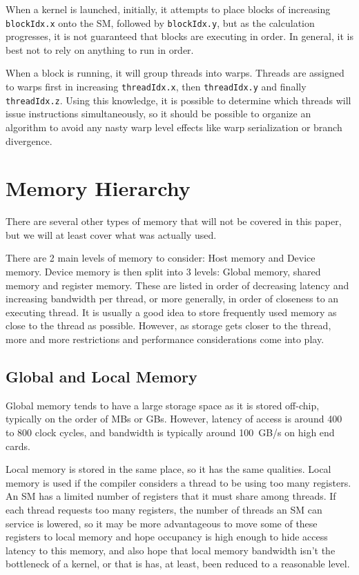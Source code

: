 \documentclass[a4paper,12pt]{report}
\begin{document}
When a kernel is launched, initially, it attempts to place blocks of increasing \verb!blockIdx.x! onto the SM, followed by \verb!blockIdx.y!, but as the calculation progresses, it is not guaranteed that blocks are executing in order.
In general, it is best not to rely on anything to run in order.

When a block is running, it will group threads into warps.
Threads are assigned to warps first in increasing \verb!threadIdx.x!, then \verb!threadIdx.y! and finally \verb!threadIdx.z!.
Using this knowledge, it is possible to determine which threads will issue instructions simultaneously, so it should be possible to organize an algorithm to avoid any nasty warp level effects like warp serialization or branch divergence.


\section{Memory Hierarchy}
There are several other types of memory that will not be covered in this paper, but we will at least cover what was actually used.

There are 2 main levels of memory to consider: Host memory and Device memory\cite[p~10]{ CUDA_C_Programming_Guide}.
Device memory is then split into 3 levels: Global memory, shared memory and register memory.
These are listed in order of decreasing latency and increasing bandwidth per thread, or more generally, in order of closeness to an executing thread\cite[p~84]{ CUDA_C_Programming_Guide}.
It is usually a good idea to store frequently used memory as close to the thread as possible.
However, as storage gets closer to the thread, more and more restrictions and performance considerations come into play.

\subsection{Global and Local Memory}

Global memory tends to have a large storage space as it is stored off-chip, typically on the order of MBs or GBs.
However, latency of access is around 400 to 800 clock cycles\cite[p~85]{ CUDA_C_Programming_Guide}, and bandwidth is typically around 100~GB/s\cite[p~78]{ KirkAndHwu} on high end cards.

Local memory is stored in the same place, so it has the same qualities\cite[p~89]{ CUDA_C_Programming_Guide}.
Local memory is used if the compiler considers a thread to be using too many registers.
An SM has a limited number of registers that it must share among threads\cite[p~80]{ CUDA_C_Programming_Guide}.
If each thread requests too many registers, the number of threads an SM can service is lowered, so it may be more advantageous to move some of these registers to local memory and hope occupancy is high enough to hide access latency to this memory, and also hope that local memory bandwidth isn't the bottleneck of a kernel, or that is has, at least, been reduced to a reasonable level.
\end{document}
